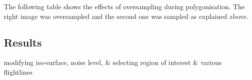 \documentclass{subfiles}
\begin{document}
\par The following table shows the effects of oversampling during polygonisation. The right image was oversampled and the second one was sampled as explained above.




\subsection{Results}

 modifying iso-surface, noise level, \&
 selecting region of interest \&
 various flightlines


 
\end{document}
